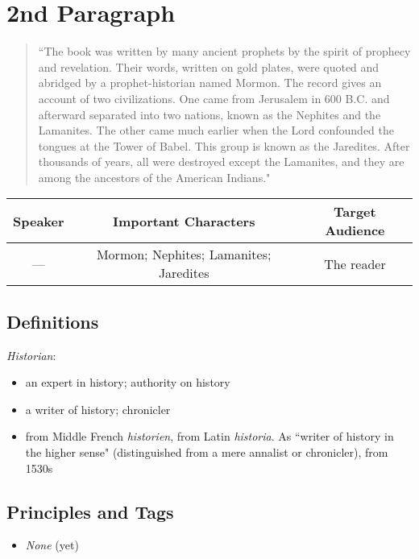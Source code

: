 \documentclass[12pt]{report}
\begin{document}
\section{2nd Paragraph\label{intro:2nd}}
\begin{center}
\begin{quote}
``The book was written by many ancient prophets by the spirit of prophecy and revelation.  Their words, written on gold plates, were quoted and abridged by a prophet-historian named Mormon.  The record gives an account of two civilizations.  One came from Jerusalem in 600 \scriptsize B.C. \normalsize and afterward separated into two nations, known as the Nephites and the Lamanites.  The other came much earlier when the Lord confounded the tongues at the Tower of Babel.  This group is known as the Jaredites.  After thousands of years, all were destroyed except the Lamanites, and they are among the ancestors of the American Indians."
\end{quote}
\end{center}

\begin{table}[h!]
\centering
\label{table:intro2}
\begin{tabular*}{\textwidth}{c @{\extracolsep{\fill}}cc}
Speaker & Important Characters & Target Audience \\
\hline
\rule{0pt}{3ex}--- & Mormon; Nephites; Lamanites; Jaredites & The reader 
\end{tabular*}
\end{table}

\subsection{Definitions\label{intro:DFN2}}
\emph{Historian}:
\begin{itemize}
\item an expert in history; authority on history
\item a writer of history; chronicler
\item from Middle French \emph{historien}, from Latin \emph{historia}. As ``writer of history in the higher sense" (distinguished from a mere annalist or chronicler), from 1530s
\end{itemize} 

\subsection{Principles and Tags\label{intro:principles2}}
\begin{itemize}
\item \emph{None} (yet)
\end{itemize}
\end{document}
